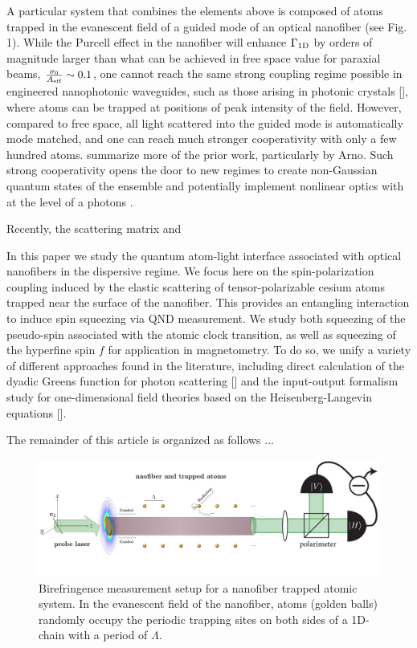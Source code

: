 \documentclass[preprint,aps,pra,onecolumn]{revtex4-1} %
\newcommand{\oneD}{{\rm 1D}}
\newcommand{\change}[1]{{\color{RoyalBlue} #1}}
\begin{document}
A particular system that combines the elements above is composed of atoms trapped in the evanescent field of a guided mode of an optical nanofiber \cite{vetsch_nanofiber-based_2012, lacroute_state-insensitive_2012} (see Fig. 1).  While the Purcell effect in the nanofiber will enhance  $\Gamma_{\oneD}$ by orders of magnitude larger than what can be achieved in free space value for paraxial beams,  $\frac{\sigma_0}{A_{\text{eff}}} \sim 0.1$, one cannot reach the same strong coupling regime possible in engineered nanophotonic waveguides, such as those arising in photonic crystals [], where atoms can be trapped at positions of peak intensity of the field.  However, compared to free space, all light scattered into the guided mode is automatically mode matched, and one can reach much stronger cooperativity with only a few hundred atoms.  {\color{red}  summarize more of the prior work, particularly by Arno}.  Such strong cooperativity opens the door to new regimes to create non-Gaussian quantum states of the ensemble \cite{} and potentially implement nonlinear optics with at the level of a photons \cite{}.

Recently, the scattering matrix and \cite{le_kien_propagation_2014}

In this paper we study the quantum atom-light interface associated with optical nanofibers in the 
dispersive regime.  We focus here on the spin-polarization coupling induced by the elastic scattering of 
tensor-polarizable cesium atoms trapped near the surface of the nanofiber.  This provides an entangling 
interaction to induce spin squeezing via QND measurement.  We study both squeezing of the 
pseudo-spin associated with the atomic clock transition, as well as squeezing of the hyperfine spin $f$ 
for application in magnetometry.  To do so, we unify a variety of different approaches found in the 
literature, including direct calculation of the dyadic Greens function for photon scattering [] and the 
input-output formalism study for one-dimensional field theories based on the Heisenberg-Langevin 
equations [].

\change{The remainder of this article is organized as follows ...}

\begin{figure}
\centering
\includegraphics[scale=0.35]{./Figs/BirefringenceMeasurement_randomAtoms}
\caption{Birefringence measurement setup for a nanofiber trapped atomic system. In the evanescent 
field of the nanofiber, atoms (golden balls) randomly  occupy the periodic trapping sites on both sides of 
a 1D-chain with a period of $\Lambda$.}
\label{fig:BirefringenceMeasurement}
\end{figure}
\end{document}
